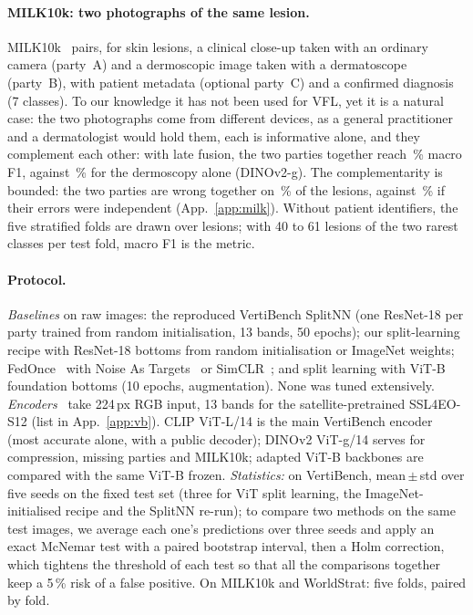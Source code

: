\paragraph{MILK10k: two photographs of the same lesion.}
MILK10k~\cite{milk10k} pairs, for \milkN{} skin lesions, a clinical close-up taken with an ordinary camera (party~A) and a dermoscopic image taken with a dermatoscope (party~B), with patient metadata (optional party~C) and a confirmed diagnosis (7 classes). To our knowledge it has not been used for VFL, yet it is a natural case: the two photographs come from different devices, as a general practitioner and a dermatologist would hold them, each is informative alone, and they complement each other: with late fusion, the two parties together reach \mfGLate\,\% macro F1, against \mfGDerm\,\% for the dermoscopy alone (DINOv2-g). The complementarity is bounded: the two parties are wrong together on \mfGBoth\,\% of the lesions, against \mfGIndep\,\% if their errors were independent (App.~\ref{app:milk}). Without patient identifiers, the five stratified folds are drawn over lesions; with 40 to 61 lesions of the two rarest classes per test fold, macro F1 is the metric.

\paragraph{Protocol.}
\emph{Baselines} on raw images: the reproduced VertiBench SplitNN (one ResNet-18 per party trained from random initialisation, 13 bands, 50 epochs); our split-learning recipe with ResNet-18 bottoms from random initialisation or ImageNet weights; FedOnce~\cite{wu2022fedonce} with Noise As Targets~\cite{bojanowski2017nat} or SimCLR~\cite{chen2020simclr}; and split learning with ViT-B foundation bottoms (10 epochs, augmentation). None was tuned extensively. \emph{Encoders}~\cite{oquab2024dinov2,radford2021clip,zhai2023siglip,wang2023ssl4eo,zhang2023biomedclip,kim2024monet} take 224\,px RGB input, 13 bands for the satellite-pretrained SSL4EO-S12 (list in App.~\ref{app:vb}). CLIP ViT-L/14 is the main VertiBench encoder (most accurate alone, with a public decoder); DINOv2 ViT-g/14 serves for compression, missing parties and MILK10k; adapted ViT-B backbones are compared with the same ViT-B frozen. \emph{Statistics:} on VertiBench, mean\,$\pm$\,std over five seeds on the fixed test set (three for ViT split learning, the ImageNet-initialised recipe and the SplitNN re-run); to compare two methods on the same test images, we average each one's predictions over three seeds and apply an exact McNemar test with a paired bootstrap interval, then a Holm correction, which tightens the threshold of each test so that all the comparisons together keep a 5\,\% risk of a false positive. On MILK10k and WorldStrat: five folds, paired by fold.

